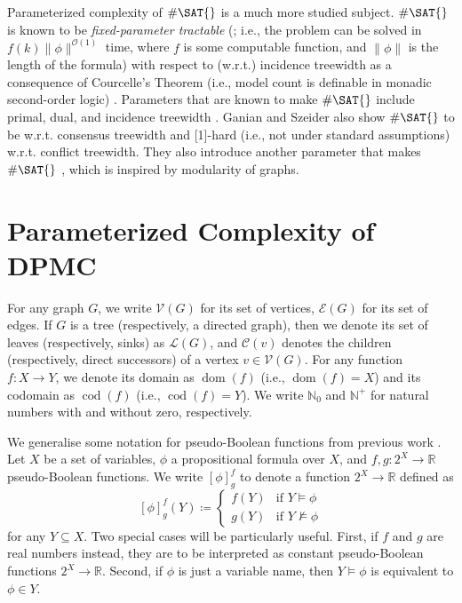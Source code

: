 \documentclass{article}
\theoremstyle{definition}
\theoremstyle{remark}
\DeclareMathOperator{\dom}{dom}
\DeclareMathOperator{\cod}{cod}
\begin{document}
Parameterized complexity of $\#\SAT{}$ is a much more studied subject.
$\#\SAT{}$ is known to be \emph{fixed-parameter tractable} (\FPT{}; i.e., the
problem can be solved in $f(k)\lVert\phi\rVert^{\mathcal{O}(1)}$ time, where $f$
is some computable function, and $\lVert\phi\rVert$ is the length of the
formula) with respect to (w.r.t.) incidence treewidth as a consequence of
Courcelle's Theorem (i.e., model count is definable in monadic second-order
logic) \cite{DBLP:journals/dam/CourcelleMR01}. Parameters that are known to make
$\#\SAT{}$ \FPT{} include primal, dual, and incidence treewidth
\cite{DBLP:journals/jda/SamerS10}. Ganian and Szeider
\cite{DBLP:journals/ai/GanianS21} also show $\#\SAT{}$ to be \FPT{} w.r.t.
consensus treewidth and \W{}[1]-hard (i.e., not \FPT{} under standard
assumptions) w.r.t. conflict treewidth. They also introduce another parameter
that makes $\#\SAT{}$ \FPT{}, which is inspired by modularity of graphs.


\section{Parameterized Complexity of \textsc{DPMC}} \label{sec:theory}

For any graph $G$, we write $\mathcal{V}(G)$ for its set of vertices,
$\mathcal{E}(G)$ for its set of edges. If $G$ is a tree (respectively, a
directed graph), then we denote its set of leaves (respectively, sinks) as
$\mathcal{L}(G)$, and $\mathcal{C}(v)$ denotes the children (respectively,
direct successors) of a vertex $v \in \mathcal{V}(G)$. For any function $f\colon
X \to Y$, we denote its domain as $\dom(f)$ (i.e., $\dom(f) = X$) and its
codomain as $\cod(f)$ (i.e., $\cod(f) = Y$). We write $\mathbb{N}_0$ and
$\mathbb{N}^+$ for natural numbers with and without zero, respectively.

We generalise some notation for pseudo-Boolean functions from previous work
\cite{my_sat_paper}. Let $X$ be a set of variables, $\phi$ a propositional
formula over $X$, and $f, g\colon 2^X \to \mathbb{R}$ pseudo-Boolean functions.
We write $[\phi]_g^f$ to denote a function $2^X \to \mathbb{R}$ defined as
\[
  [\phi]^f_g(Y) \coloneqq
  \begin{cases}
    f(Y) & \text{if } Y \models \phi \\
    g(Y) & \text{if } Y \not\models \phi
  \end{cases}
\]
for any $Y \subseteq X$. Two special cases will be particularly useful. First,
if $f$ and $g$ are real numbers instead, they are to be interpreted as constant
pseudo-Boolean functions $2^X \to \mathbb{R}$. Second, if $\phi$ is just a
variable name, then $Y \models \phi$ is equivalent to $\phi \in Y$.
\end{document}
